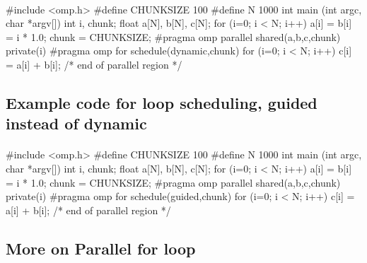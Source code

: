 \documentclass[%
oneside,                 %
final,                   %
10pt]{article}
\begin{document}
\paragraph{}
















\bcppcod
#include <omp.h>
#define CHUNKSIZE 100
#define N 1000
int main (int argc, char *argv[])
{
int i, chunk;
float a[N], b[N], c[N];
for (i=0; i < N; i++) a[i] = b[i] = i * 1.0;
chunk = CHUNKSIZE;
#pragma omp parallel shared(a,b,c,chunk) private(i)
{
#pragma omp for schedule(dynamic,chunk)
for (i=0; i < N; i++) c[i] = a[i] + b[i];
} /* end of parallel region */
}

\ecppcod



\subsection{Example code for loop scheduling, guided instead of dynamic}

\paragraph{}
















\bcppcod
#include <omp.h>
#define CHUNKSIZE 100
#define N 1000
int main (int argc, char *argv[])
{
int i, chunk;
float a[N], b[N], c[N];
for (i=0; i < N; i++) a[i] = b[i] = i * 1.0;
chunk = CHUNKSIZE;
#pragma omp parallel shared(a,b,c,chunk) private(i)
{
#pragma omp for schedule(guided,chunk)
for (i=0; i < N; i++) c[i] = a[i] + b[i];
} /* end of parallel region */
}

\ecppcod



\subsection{More on Parallel for loop}
\end{document}
